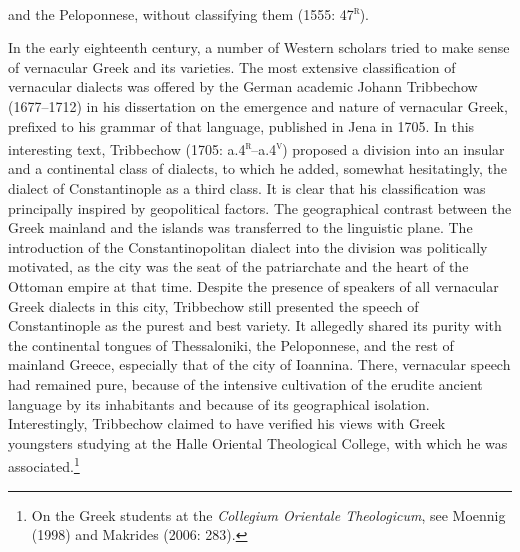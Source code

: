 \documentclass[12pt]{article}
\newenvironment{styleStandard}{\renewcommand\baselinestretch{1.25}\setlength\leftskip{0in}\setlength\rightskip{0in}\setlength\parindent{0.1972in}\setlength\parfillskip{0pt plus 1fil}\setlength\parskip{0in plus 1pt}\writerlistparindent\writerlistleftskip\leavevmode\normalfont\normalsize\writerlistlabel\ignorespaces}{\unskip\vspace{0in plus 1pt}\par}
\newcommand\writerlistleftskip{}
\newcommand\writerlistparindent{}
\newcommand\writerlistlabel{}
\begin{document}
\begin{styleStandard}
and the Peloponnese, without classifying them (1555: 47\textsc{\textsuperscript{r}}).
\end{styleStandard}

\begin{styleStandard}
In the early eighteenth century, a number of Western scholars tried to make sense of vernacular Greek and its varieties. The most extensive classification of vernacular dialects was offered by the German academic Johann Tribbechow (1677–1712) in his dissertation on the emergence and nature of vernacular Greek, prefixed to his grammar of that language, published in Jena in 1705. In this interesting text, Tribbechow (1705: a.4\textsc{\textsuperscript{r}}\textsc{–}a.4\textsc{\textsuperscript{v}}) proposed a division into an insular and a continental class of dialects, to which he added, somewhat hesitatingly, the dialect of Constantinople as a third class. It is clear that his classification was principally inspired by geopolitical factors. The geographical contrast between the Greek mainland and the islands was transferred to the linguistic plane. The introduction of the Constantinopolitan dialect into the division was politically motivated, as the city was the seat of the patriarchate and the heart of the Ottoman empire at that time. Despite the presence of speakers of all vernacular Greek dialects in this city, Tribbechow still presented the speech of Constantinople as the purest and best variety. It allegedly shared its purity with the continental tongues of Thessaloniki, the Peloponnese, and the rest of mainland Greece, especially that of the city of Ioannina. There, vernacular speech had remained pure, because of the intensive cultivation of the erudite ancient language by its inhabitants and because of its geographical isolation. Interestingly, Tribbechow claimed to have verified his views with Greek youngsters studying at the Halle Oriental Theological College, with which he was associated.\footnote{ On the Greek students at the \textit{Collegium Orientale Theologicum}, see Moennig (1998) and Makrides (2006: 283).}
\end{styleStandard}
\end{document}
